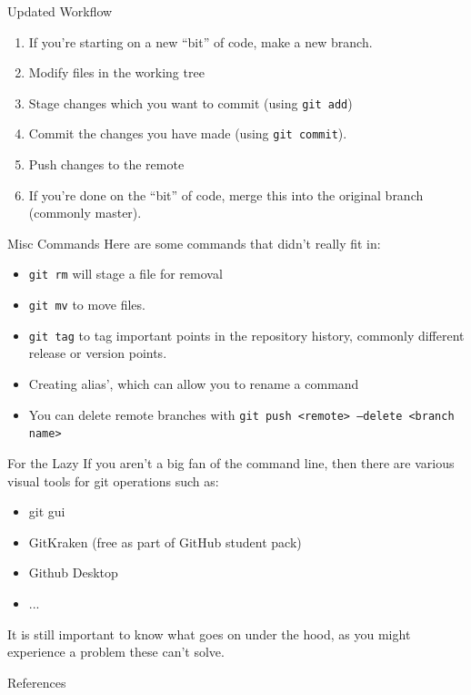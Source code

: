 \documentclass{beamer}
\begin{document}
\begin{frame}{Updated Workflow}
    \begin{enumerate}
        \item If you're starting on a new ``bit'' of code, make a new branch.
        \item Modify files in the working tree
        \item Stage changes which you want to commit (using \texttt{git add})
        \item Commit the changes you have made (using \texttt{git commit}).
        \item Push changes to the remote
        \item If you're done on the ``bit'' of code, merge this into the original branch (commonly master).
    \end{enumerate}
\end{frame}

\begin{frame}{Misc Commands}
Here are some commands that didn't really fit in:
\begin{itemize}
    \item \texttt{git rm} will stage a file for removal
    \item \texttt{git mv} to move files. 
    \item \texttt{git tag} to tag important points in the repository history, commonly different release or version points.
    \item Creating alias', which can allow you to rename a command
    \item You can delete remote branches with \texttt{git push <remote> --delete <branch name>}
\end{itemize}
\end{frame}

\begin{frame}{For the Lazy}
    If you aren't a big fan of the command line, then there are various visual tools for git operations such as:
    \begin{itemize}
        \item git gui
        \item GitKraken (free as part of GitHub student pack)
        \item Github Desktop
        \item ...
    \end{itemize}
    It is still important to know what goes on under the hood, as you might experience a problem these can't solve.
\end{frame}

\begin{frame}{References}
    \printbibliography[heading=none]
\end{frame}
\end{document}
